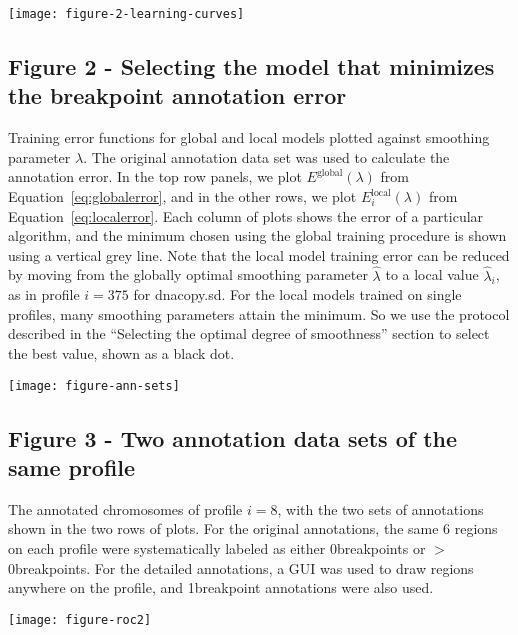 \documentclass[10pt]{bmc_article}
\newcommand{\sectionpick}{Selecting the optimal degree of smoothness}
\newenvironment{bmcformat}{\begin{raggedright}\baselineskip20pt\sloppy\setboolean{publ}{false}}{\end{raggedright}\baselineskip20pt\sloppy}
\begin{document}
\begin{bmcformat}
\newpage

\texttt{[image: figure-2-learning-curves]}

\subsection*{Figure 2 - Selecting the model that minimizes the
  breakpoint annotation error}
Training error functions for global and local models plotted against
smoothing parameter $\lambda$. The original annotation data set was used to
calculate the annotation error. In the top row panels, we plot
$E^{\text{global}}(\lambda)$ from Equation~\ref{eq:globalerror}, and
in the other rows, we plot $E^{\text{local}}_i(\lambda)$ from
Equation~\ref{eq:localerror}. Each column of plots shows the error of
a particular algorithm, and the minimum chosen using the global
training procedure is shown using a vertical grey line. Note that the
local model training error can be reduced by moving from the globally
optimal smoothing parameter $\hat \lambda$ to a local value $\hat
\lambda_i$, as in profile $i=375$ for dnacopy.sd. For the local models
trained on single profiles, many smoothing parameters attain the
minimum. So we use the protocol described in the ``\sectionpick''
section to select the best value, shown as a black dot.

\newpage

\texttt{[image: figure-ann-sets]}

\subsection*{Figure 3 - Two annotation data sets of the same profile}

The annotated chromosomes of profile $i=8$, with the two sets of
annotations shown in the two rows of plots. For the original
annotations, the same 6 regions on each profile were systematically
labeled as either 0breakpoints or $>$0breakpoints. For the detailed
annotations, a GUI was used to draw regions anywhere on the profile,
and 1breakpoint annotations were also used.

\newpage

\texttt{[image: figure-roc2]}



\end{bmcformat}
\end{document}
